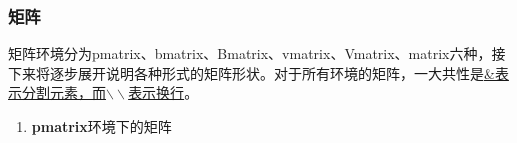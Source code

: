 \documentclass[11pt]{article}
\begin{document}
    \subsubsection{矩阵}
    矩阵环境分为pmatrix、bmatrix、Bmatrix、vmatrix、Vmatrix、matrix六种，接下来将逐步展开说明各种形式的矩阵形状。对于所有环境的矩阵，一大共性是\underline{\&表示分割元素，而$\backslash\backslash$表示换行}。
    \begin{enumerate}
    	\item \textbf{pmatrix}环境下的矩阵
    	\begin{multicols}{2}
    		\centering
    	\end{multicols}
    	

\end{enumerate}
\end{document}
